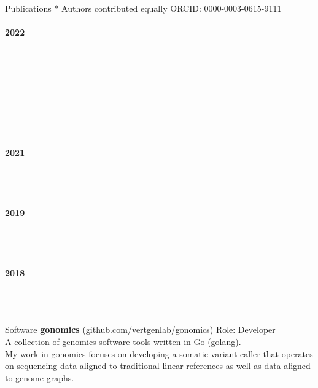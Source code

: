 \documentclass{resume} %
\begin{document}
\begin{rSection}{Publications}
{* Authors contributed equally} \hfill {ORCID: 0000-0003-0615-9111}
%
\\ \\ {\bf 2022} 
\\ 
\\
\\ 
\\
\\ 
\\
\\ 
\\ 
%
\\ \\ {\bf 2021} 
\\ 
\\
\\ 
%
\\ \\{\bf 2019} 
\\ 
\\
\\ 
%
\\ \\ {\bf 2018}
\\ 
\\
\\ 
\\
\end{rSection}


\begin{rSection}{Software}
{\bf gonomics} {(github.com/vertgenlab/gonomics)} \hfill{Role: Developer}
\\ {A collection of genomics software tools written in Go (golang).}
\\ {My work in gonomics focuses on developing a somatic variant caller that operates on sequencing data 
aligned to traditional linear references as well as data aligned to genome graphs.}


\end{rSection}
\end{document}
